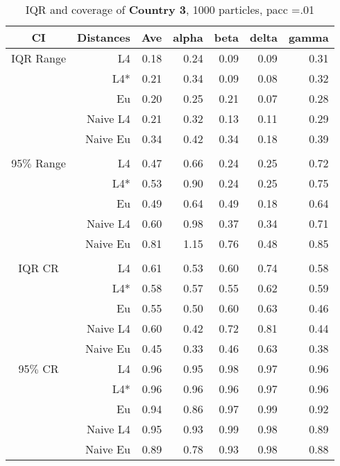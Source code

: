 \documentclass[a4paper,12pt,twoside]{book}
\begin{document}
\begin{table}[H]
\centering
\caption{IQR and coverage of \textbf{Country 3}, 1000 particles, pacc =.01}

\begin{tabular}{crrrrrr}
  \hline
{\color{blue}CI} & Distances & Ave & alpha & beta & delta & gamma \\ 
  \hline
{\color{blue}IQR Range} & L4  &0.18 & 0.24 & 0.09 & 0.09 & 0.31 \\ 
 
   
&L4*  & 0.21 & 0.34 & 0.09 & 0.08 & 0.32 \\ 
  
&Eu & 0.20 & 0.25 & 0.21 & 0.07 & 0.28 \\ 
 
&Naive L4&      
  0.21 & 0.32 & 0.13 & 0.11 & 0.29 \\ 
&Naive Eu &     0.34 & 0.42 & 0.34 & 0.18 & 0.39 \\ 
   \\ 
    {\color{blue}95$\%$ Range} & L4  &0.47 & 0.66 & 0.24 & 0.25 & 0.72 \\ 
   
    &L4*  & 0.53 & 0.90 & 0.24 & 0.25 & 0.75 \\ 
  
&Eu &  0.49 & 0.64 & 0.49 & 0.18 & 0.64 \\ 
  
&Naive L4&     0.60 & 0.98 & 0.37 & 0.34 & 0.71 \\
 
&Naive Eu &     0.81 & 1.15 & 0.76 & 0.48 & 0.85 \\ 
 
\\   
   \hline
   
{\color{blue} IQR CR } & L4  &0.61 & 0.53 & 0.60 & 0.74 & 0.58 \\ 
  
&L4*  &   0.58 & 0.57 & 0.55 & 0.62 & 0.59 \\ 
  
&Eu &     0.55 & 0.50 & 0.60 & 0.63 & 0.46 \\ 
 
&Naive L4& 0.60 & 0.42 & 0.72 & 0.81 & 0.44 \\ 
  
 
&Naive Eu &  0.45 & 0.33 & 0.46 & 0.63 & 0.38 \\ 
  

 {\color{blue} 95$\%$ CR }& L4  &0.96 & 0.95 & 0.98 & 0.97 & 0.96 \\ 
  
  &L4*  &0.96 & 0.96 & 0.96 & 0.97 & 0.96 \\ 
  
   
&Eu &  0.94 & 0.86 & 0.97 & 0.99 & 0.92 \\ 
 
  
&Naive L4&    
 0.95 & 0.93 & 0.99 & 0.98 & 0.89 \\ 
 
&Naive Eu &    0.89 & 0.78 & 0.93 & 0.98 & 0.88 \\ 
  
\end{tabular}

\end{table}
\end{document}
